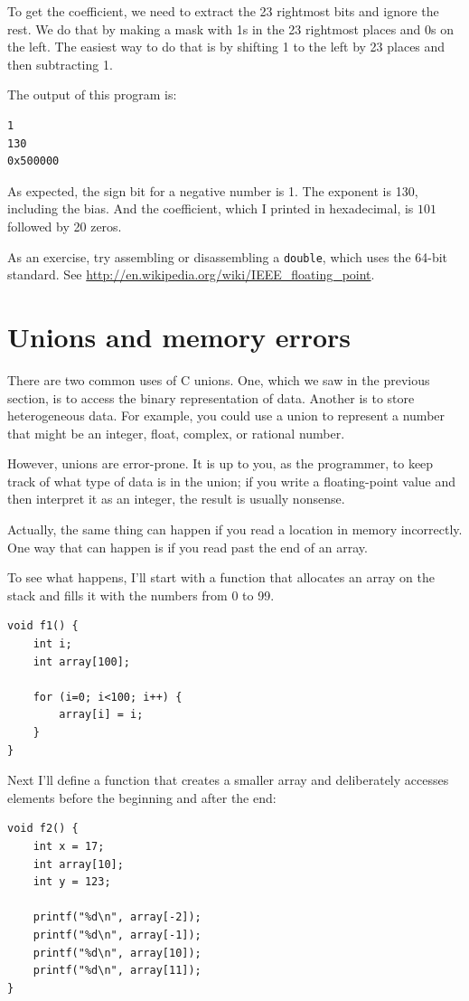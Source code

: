 \documentclass[12pt]{book}
\begin{document}
To get the coefficient, we need to extract the 23 rightmost bits
and ignore the rest.  We do that by making a mask with 1s in the
23 rightmost places and 0s on the left.  The easiest way to do that
is by shifting 1 to the left by 23 places and then subtracting 1.  

The output of this program is:
%
\begin{verbatim}
1
130
0x500000
\end{verbatim}
%
As expected, the sign bit for a negative number is 1.  The exponent 
is 130, including the bias.  And the coefficient, which I printed in
hexadecimal, is $101$ followed by 20 zeros.

As an exercise, try assembling or disassembling a {\tt double}, which
uses the 64-bit standard.  See
\url{http://en.wikipedia.org/wiki/IEEE_floating_point}.


\section{Unions and memory errors}

There are two common uses of C unions.  One, which we saw in the
previous section, is to access the binary representation of data.
Another is to store heterogeneous data.  For example, you could
use a union to represent a number that might be an integer, float,
complex, or rational number.

However, unions are error-prone.  It is up to you, as the programmer,
to keep track of what type of data is in the union; if you write
a floating-point value and then interpret it as an integer, the result
is usually nonsense.

Actually, the same thing can happen if you read a location in memory
incorrectly.  One way that can happen is if you read past the end of
an array.

To see what happens, I'll start with a function that allocates an
array on the stack and fills it with the numbers from 0 to 99.

\begin{verbatim}
void f1() {
    int i;
    int array[100];

    for (i=0; i<100; i++) {
        array[i] = i;
    }
}
\end{verbatim}

Next I'll define a function that creates a smaller array and
deliberately accesses elements before the beginning and after
the end:

\begin{verbatim}
void f2() {
    int x = 17;
    int array[10];
    int y = 123;

    printf("%d\n", array[-2]);
    printf("%d\n", array[-1]);
    printf("%d\n", array[10]);
    printf("%d\n", array[11]);
}
\end{verbatim}
\end{document}
